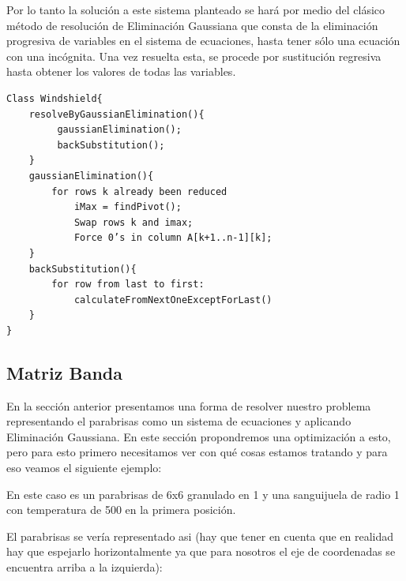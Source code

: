 \newpage

Por lo tanto la solución a este sistema planteado se hará por medio del clásico método de resolución de Eliminación Gaussiana que consta de la eliminación progresiva de variables en el sistema de ecuaciones, hasta tener sólo una ecuación con una incógnita. Una vez resuelta esta, se procede por sustitución regresiva hasta obtener los valores de todas las variables.

\begin{verbatim}
Class Windshield{
    resolveByGaussianElimination(){
         gaussianElimination();
         backSubstitution();
    } 
    gaussianElimination(){
        for rows k already been reduced
            iMax = findPivot();
            Swap rows k and imax;
            Force 0’s in column A[k+1..n-1][k];
    }
    backSubstitution(){
        for row from last to first:
            calculateFromNextOneExceptForLast()
    }
}
\end{verbatim}

\subsection{Matriz Banda}

En la sección anterior presentamos una forma de resolver nuestro problema representando el parabrisas como un sistema de ecuaciones y aplicando Eliminación Gaussiana. En este sección propondremos una optimización a esto, pero para esto primero necesitamos ver con qué cosas estamos tratando y para eso veamos el siguiente ejemplo:

En este caso es un parabrisas de 6x6 granulado en 1 y una sanguijuela de radio 1 con temperatura de 500 en la primera posición.

El parabrisas se vería representado asi (hay que tener en cuenta que en realidad hay que espejarlo horizontalmente ya que para nosotros el eje de coordenadas se encuentra arriba a la izquierda):

